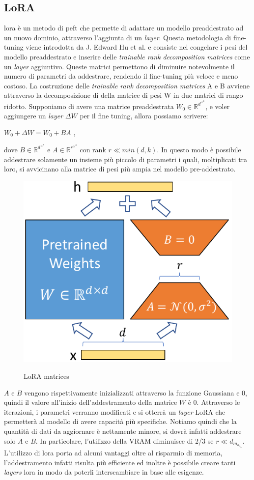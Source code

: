     \subsection{LoRA}
    \gls{lora} è un metodo di \gls{peft} che permette di adattare un modello preaddestrato ad un nuovo dominio, attraverso l'aggiunta di un \textit{layer}.
    Questa metodologia di \gls{fine-tuning} viene introdotta da J. Edward Hu et al.\cite{article:Hu2021LoRALA} e consiste nel congelare i pesi del modello preaddestrato e inserire delle \textit{trainable rank decomposition matrices} come un \textit{layer} aggiuntivo.
    Queste matrici permettono di diminuire notevolmente il numero di parametri da addestrare, rendendo il \gls{fine-tuning} più veloce e meno costoso.
    La costruzione delle \textit{trainable rank decomposition matrices} A e B avviene attraverso la decomposizione di della matrice di pesi W in due matrici di rango ridotto.
    Supponiamo di avere una matrice preaddestrata $W_0 \in \mathbb{R}^d^\times^k$, e voler aggiungere un \textit{layer} $\Delta W$ per il fine tuning, allora possiamo scrivere:\newline 
    \centerline{$ W_0 + \Delta W = W_0 + BA$ ,}
    \newline 
    dove $B \in \mathbb{R}^d^\times^r$ e $A \in \mathbb{R}^r^\times^k$ con rank $r \ll min(d, k)$. 
    In questo modo è possibile addestrare solamente un insieme più piccolo di parametri i quali, moltiplicati tra loro, si avvicinano alla matrice di pesi più ampia nel modello pre-addestrato.
    \begin{figure}[htp]
        \centering
        \includegraphics[alt={Testo alternativo dell'immagine}, width=0.5\columnwidth]{img/figure1.pdf}
        \caption{LoRA matrices}
        \label{fig:entanglement}
    \end{figure}
    \newline
    $A$ e $B$ vengono rispettivamente inizializzati attraverso la funzione Gaussiana e 0, quindi il valore all'inizio dell'addestramento della matrice $W$ è 0. Attraverso le iterazioni, i parametri verranno modificati e si otterrà un \textit{layer} LoRA che permetterà al modello di avere capacità più specifiche.
    Notiamo quindi che la quantità di dati da aggiornare è nettamente minore, si dovrà infatti addestrare solo $A$ e $B$. In particolare, l'utilizzo della VRAM diminuisce di 2/3 se  $r \ll d_m_o_d_e_l$.
    L'utilizzo di \gls{lora} porta ad alcuni vantaggi oltre al risparmio di memoria, l'addestramento infatti risulta più efficiente ed inoltre è possibile creare tanti \textit{layers} \gls{lora} in modo da poterli interscambiare in base alle esigenze.

